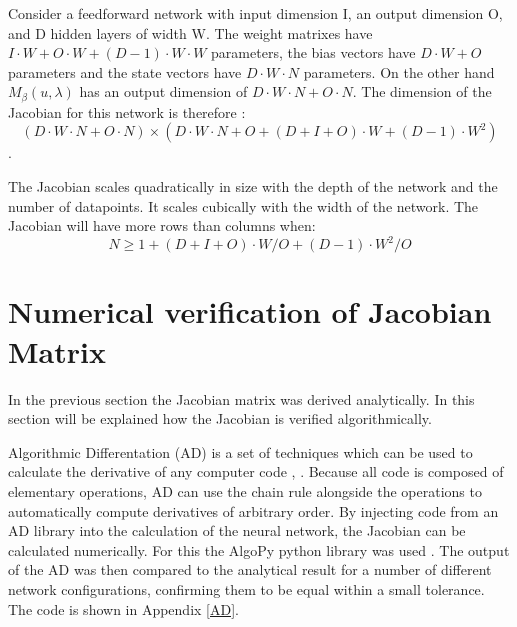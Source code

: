 Consider a feedforward network with input dimension I, an output dimension O, and D hidden layers of width W. The weight matrixes have $I \cdot W + O \cdot W + (D-1) \cdot W \cdot W$ parameters, the bias vectors have $D \cdot W+O$ parameters and the state vectors have $D \cdot W \cdot N$ parameters. On the other hand $M_{\beta}(u,\lambda)$ has an output dimension of $D \cdot W \cdot N + O \cdot N$. The dimension of the Jacobian for this network is therefore :
\begin{equation}
(D \cdot W \cdot N + O \cdot N) \times (D \cdot W \cdot N + O + (D+I+O) \cdot W + (D-1) \cdot W^2)
\label{jdim}
\end{equation}. 

The Jacobian scales quadratically in size with the depth of the network and the number of datapoints. It scales cubically with the width of the network. The Jacobian will have more rows than columns when:
\begin{equation}
	N \geq 1 + (D+I+O) \cdot W/O + (D-1) \cdot W^2/O
\end{equation}



\section{Numerical verification of Jacobian Matrix}
In the previous section the Jacobian matrix was derived analytically. In this section will be explained how the Jacobian is verified algorithmically.

Algorithmic Differentation (AD) is a set of techniques which can be used to calculate the derivative of any computer code \cite{Rall1981}, \cite{wikiad}. Because all code is composed of elementary operations, AD can use the chain rule alongside the operations to automatically compute derivatives of arbitrary order. By injecting code from an AD library into the calculation of the neural network, the Jacobian can be calculated numerically. For this the AlgoPy python library was used \cite{algopy}. The output of the AD was then compared to the analytical result for a number of different network configurations, confirming them to be equal within a small tolerance. The code is shown in Appendix \ref{AD}.

